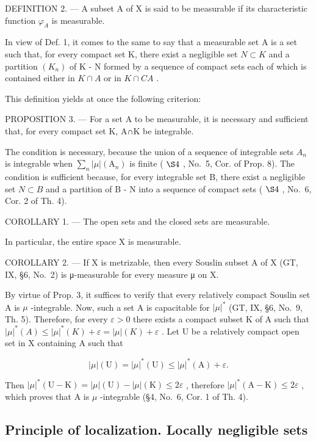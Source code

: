 DEFINITION 2. --- A subset A of X is said to be measurable if its characteristic function \(\varphi_{A}\) is measurable.

In view of Def. 1, it comes to the same to say that a measurable set A is a set such that, for every compact set K, there exist a negligible set \(N \subset K\) and a partition \((K_{n})\) of K - N formed by a sequence of compact sets each of which is contained either in \(K \cap A\) or in \(K \cap C A\) .

This definition yields at once the following criterion:

PROPOSITION 3. --- For a set A to be measurable, it is necessary and sufficient that, for every compact set K, A∩K be integrable.

The condition is necessary, because the union of a sequence of integrable sets \(A_{n}\) is integrable when \(\sum_{n}|\mu|(\mathrm{A}_{n})\) is finite ( \(\S4\) , No.~5, Cor. of Prop. 8). The condition is sufficient because, for every integrable set B, there exist a negligible set \(N \subset B\) and a partition of B - N into a sequence of compact sets ( \(\S4\) , No.~6, Cor. 2 of Th. 4).

COROLLARY 1. --- The open sets and the closed sets are measurable.

In particular, the entire space \(\mathrm{X}\) is measurable.

COROLLARY 2. --- If X is metrizable, then every Souslin subset A of X (GT, IX, §6, No.~2) is μ-measurable for every measure μ on X.

By virtue of Prop. 3, it suffices to verify that every relatively compact Souslin set A is \(\mu\) -integrable. Now, such a set A is capacitable for \(|\mu|^*\) (GT, IX, §6, No.~9, Th. 5). Therefore, for every \(\varepsilon > 0\) there exists a compact subset K of A such that \(|\mu|^*(A) \leqslant |\mu|^*(K) + \varepsilon = |\mu|(K) + \varepsilon\) . Let U be a relatively compact open set in X containing A such that

\[
| \mu | (\mathrm{U}) = | \mu | ^ {*} (\mathrm{U}) \leqslant | \mu | ^ {*} (\mathrm{A}) + \varepsilon .
\]

Then \(|\mu|^*(\mathrm{U} - \mathrm{K}) = |\mu|(\mathrm{U}) - |\mu|(\mathrm{K}) \leqslant 2\varepsilon\) , therefore \(|\mu|^*(\mathrm{A} - \mathrm{K}) \leqslant 2\varepsilon\) , which proves that A is \(\mu\) -integrable (§4, No.~6, Cor. 1 of Th. 4).

\subsection{Principle of localization. Locally negligible sets}

